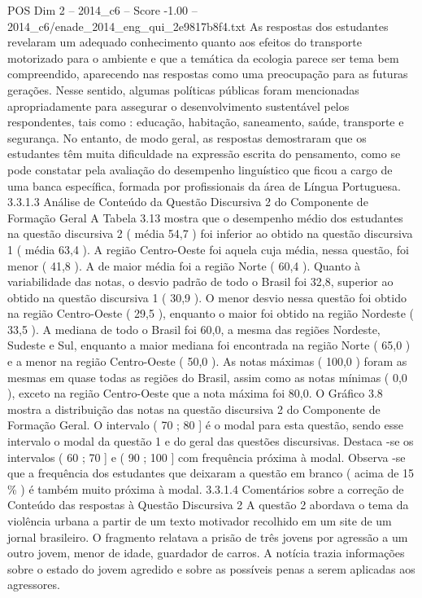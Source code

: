 \begin{textsample}{POS Dim 2 – 2014\_c6 – Score -1.00 – 2014\_c6/enade\_2014\_eng\_qui\_2e9817b8f4.txt}
As respostas dos estudantes revelaram um adequado conhecimento quanto aos efeitos do transporte motorizado para o ambiente e que a temática da ecologia parece ser tema bem compreendido, aparecendo nas respostas como uma preocupação para as futuras gerações.
Nesse sentido, algumas políticas públicas foram mencionadas apropriadamente para assegurar o desenvolvimento sustentável pelos respondentes, tais como : educação, habitação, saneamento, saúde, transporte e segurança.
No entanto, de modo geral, as respostas demostraram que os estudantes têm muita dificuldade na expressão escrita do pensamento, como se pode constatar pela avaliação do desempenho linguístico que ficou a cargo de uma banca específica, formada por profissionais da área de Língua Portuguesa. 3.3.1.3 Análise de Conteúdo da Questão Discursiva 2 do Componente de Formação Geral A Tabela 3.13 mostra que o desempenho médio dos estudantes na questão discursiva 2 ( média 54,7 ) foi inferior ao obtido na questão discursiva 1 ( média 63,4 ).
A região Centro-Oeste foi aquela cuja média, nessa questão, foi menor ( 41,8 ).
A de maior média foi a região Norte ( 60,4 ).
Quanto à variabilidade das notas, o desvio padrão de todo o Brasil foi 32,8, superior ao obtido na questão discursiva 1 ( 30,9 ).
O menor desvio nessa questão foi obtido na região Centro-Oeste ( 29,5 ), enquanto o maior foi obtido na região Nordeste ( 33,5 ).
A mediana de todo o Brasil foi 60,0, a mesma das regiões Nordeste, Sudeste e Sul, enquanto a maior mediana foi encontrada na região Norte ( 65,0 ) e a menor na região Centro-Oeste ( 50,0 ).
As notas máximas ( 100,0 ) foram as mesmas em quase todas as regiões do Brasil, assim como as notas mínimas ( 0,0 ), exceto na região Centro-Oeste que a nota máxima foi 80,0.
O Gráfico 3.8 mostra a distribuição das notas na questão discursiva 2 do Componente de Formação Geral.
O intervalo ( 70 ; 80 ] é o modal para esta questão, sendo esse intervalo o modal da questão 1 e do geral das questões discursivas.
Destaca -se os intervalos ( 60 ; 70 ] e ( 90 ; 100 ] com frequência próxima à modal.
Observa -se que a frequência dos estudantes que deixaram a questão em branco ( acima de 15 \% ) é também muito próxima à modal. 3.3.1.4 Comentários sobre a correção de Conteúdo das respostas à Questão Discursiva 2 A questão 2 abordava o tema da violência urbana a partir de um texto motivador recolhido em um site de um jornal brasileiro.
O fragmento relatava a prisão de três jovens por agressão a um outro jovem, menor de idade, guardador de carros.
A notícia trazia informações sobre o estado do jovem agredido e sobre as possíveis penas a serem aplicadas aos agressores.

\end{textsample}
